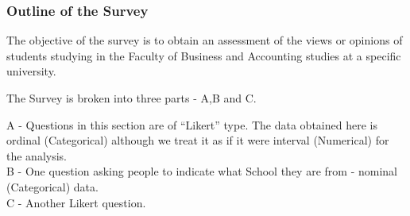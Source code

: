 \documentclass[a4]{beamer}
\begin{document}





\begin{frame}\frametitle{Outline of the Survey}
The objective of the survey is to obtain an assessment of the views or opinions of students studying in the Faculty of Business and Accounting studies at a specific university.

\vspace{0.4cm}

The Survey is broken into three parts - A,B and C. \\ \vspace{0.2cm}

A - Questions in this section are of ``Likert'' type. The data obtained here is ordinal (Categorical) although we treat it as if it were interval (Numerical) for the analysis.\\
\vspace{0.2cm}
B - One question asking people to indicate what School they are from - nominal (Categorical) data.\\
\vspace{0.2cm}
C - Another Likert question.
\end{frame}
\end{document}
